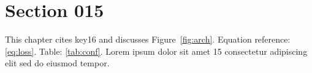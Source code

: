 \section{Section 015}\label{sec:s15}
This chapter cites key16 and discusses Figure~\ref{fig:arch}.
Equation reference: \eqref{eq:loss}. Table: \ref{tab:conf}.
Lorem ipsum dolor sit amet 15 consectetur adipiscing elit sed do eiusmod tempor.
